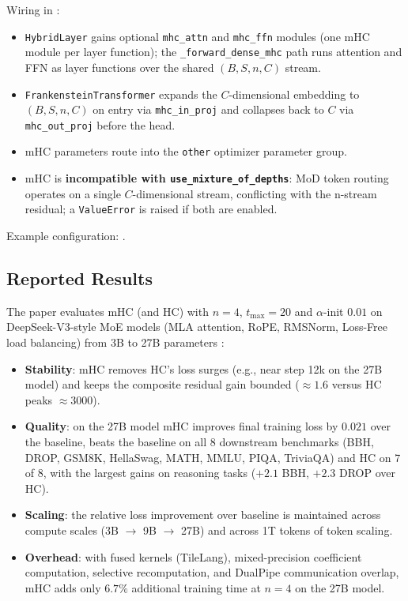 Wiring in :
\begin{itemize}[leftmargin=*]
    \item \texttt{HybridLayer} gains optional \texttt{mhc\_attn} and
        \texttt{mhc\_ffn} modules (one mHC module per layer function); the
        \texttt{\_forward\_dense\_mhc} path runs attention and FFN as layer
        functions over the shared $(B, S, n, C)$ stream.
    \item \texttt{FrankensteinTransformer} expands the $C$-dimensional
        embedding to $(B, S, n, C)$ on entry via \texttt{mhc\_in\_proj} and
        collapses back to $C$ via \texttt{mhc\_out\_proj} before the head.
    \item mHC parameters route into the \texttt{other} optimizer parameter
        group.
    \item mHC is \textbf{incompatible with \texttt{use\_mixture\_of\_depths}}:
        MoD token routing operates on a single $C$-dimensional stream,
        conflicting with the n-stream residual; a \texttt{ValueError} is raised
        if both are enabled.
\end{itemize}

Example configuration: .

\subsection{Reported Results}

The paper evaluates mHC (and HC) with $n = 4$, $t_{\max} = 20$ and
$\alpha$-init $0.01$ on DeepSeek-V3-style MoE models (MLA attention, RoPE,
RMSNorm, Loss-Free load balancing) from 3B to 27B parameters
\citep{xie_mhc_2025}:
\begin{itemize}[leftmargin=*]
    \item \textbf{Stability}: mHC removes HC's loss surges (e.g., near step
        12k on the 27B model) and keeps the composite residual gain bounded
        ($\approx 1.6$ versus HC peaks $\approx 3000$).
    \item \textbf{Quality}: on the 27B model mHC improves final training loss
        by $0.021$ over the baseline, beats the baseline on all 8 downstream
        benchmarks (BBH, DROP, GSM8K, HellaSwag, MATH, MMLU, PIQA, TriviaQA)
        and HC on 7 of 8, with the largest gains on reasoning tasks
        ($+2.1$ BBH, $+2.3$ DROP over HC).
    \item \textbf{Scaling}: the relative loss improvement over baseline is
        maintained across compute scales (3B $\to$ 9B $\to$ 27B) and across
        1T tokens of token scaling.
    \item \textbf{Overhead}: with fused kernels (TileLang), mixed-precision
        coefficient computation, selective recomputation, and DualPipe
        communication overlap, mHC adds only $6.7\%$ additional training time
        at $n = 4$ on the 27B model.
\end{itemize}

